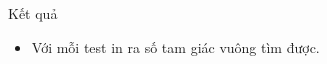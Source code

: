Kết quả  
\begin{itemize}
	\item     Với mỗi test in ra số tam giác vuông tìm được.   
\end{itemize}